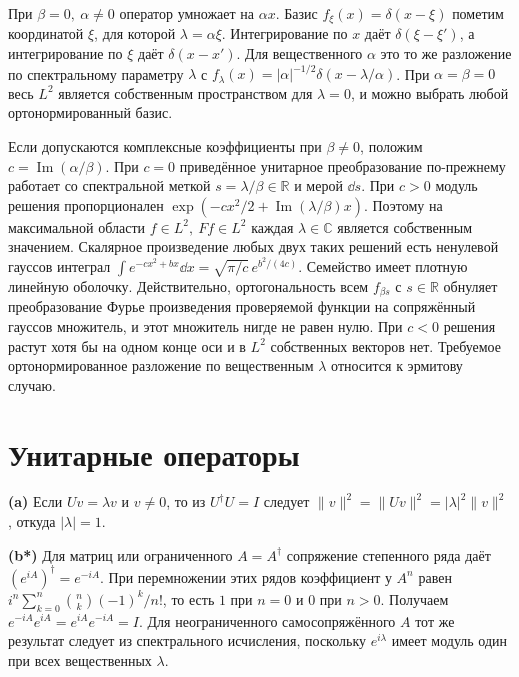 \documentclass[11pt,a4paper]{article}
\begin{document}
При \(\beta=0,\ \alpha\ne0\) оператор умножает на \(\alpha x\).
Базис \(f_\xi(x)=\delta(x-\xi)\) пометим координатой \(\xi\),
для которой \(\lambda=\alpha\xi\).
Интегрирование по \(x\) даёт \(\delta(\xi-\xi')\), а интегрирование по
\(\xi\) даёт \(\delta(x-x')\). Для вещественного \(\alpha\) это то же
разложение по спектральному параметру \(\lambda\) с
\(f_\lambda(x)=|\alpha|^{-1/2}\delta(x-\lambda/\alpha)\).
При \(\alpha=\beta=0\) весь \(L^2\) является собственным пространством
для \(\lambda=0\), и можно выбрать любой ортонормированный базис.

Если допускаются комплексные коэффициенты при \(\beta\ne0\), положим
\(c=\operatorname{Im}(\alpha/\beta)\). При \(c=0\) приведённое
унитарное преобразование по-прежнему работает со спектральной меткой
\(s=\lambda/\beta\in\mathbb R\) и мерой \(\dd s\).
При \(c>0\) модуль решения пропорционален
\(\exp(-cx^2/2+\operatorname{Im}(\lambda/\beta)x)\).
Поэтому на максимальной области \(f\in L^2,\ Ff\in L^2\) каждая
\(\lambda\in\mathbb C\) является собственным значением.
Скалярное произведение любых двух таких решений есть ненулевой
гауссов интеграл \(\int e^{-cx^2+bx}\dd x=\sqrt{\pi/c}\,e^{b^2/(4c)}\).
Семейство имеет плотную линейную оболочку. Действительно,
ортогональность всем \(f_{\beta s}\) с \(s\in\mathbb R\) обнуляет
преобразование Фурье произведения проверяемой функции на сопряжённый
гауссов множитель, и этот множитель нигде не равен нулю.
При \(c<0\) решения растут хотя бы на одном конце оси и в \(L^2\)
собственных векторов нет. Требуемое ортонормированное разложение по
вещественным \(\lambda\) относится к эрмитову случаю.

\section{Унитарные операторы}

\textbf{(a)} Если \(Uv=\lambda v\) и \(v\ne0\), то из \(U^\dagger U=I\)
следует \(\|v\|^2=\|Uv\|^2=|\lambda|^2\|v\|^2\), откуда
\(|\lambda|=1\).

\textbf{(b*)} Для матриц или ограниченного \(A=A^\dagger\) сопряжение
степенного ряда даёт \((e^{iA})^\dagger=e^{-iA}\). При перемножении
этих рядов коэффициент у \(A^n\) равен
\(i^n\sum_{k=0}^n\binom nk(-1)^k/n!\), то есть \(1\) при \(n=0\)
и \(0\) при \(n>0\). Получаем \(e^{-iA}e^{iA}=e^{iA}e^{-iA}=I\).
Для неограниченного самосопряжённого \(A\) тот же результат следует
из спектрального исчисления, поскольку \(e^{i\lambda}\) имеет модуль
один при всех вещественных \(\lambda\).
\end{document}
